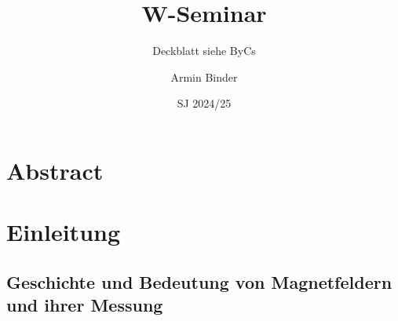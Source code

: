 \documentclass[12pt, a4paper]{article}
\title{W-Seminar}
\subtitle{Deckblatt siehe ByCs}
\author{Armin Binder }
\date{SJ 2024/25}
\begin{document}
\pagestyle{fancy}
\fancyhf{} 
\fancyfoot[C]{\thepage}

\maketitle
\thispagestyle{empty}
\pagebreak

\tableofcontents
\thispagestyle{empty}
\pagebreak

\section{Abstract}


\section{Einleitung}
\subsection{Geschichte und Bedeutung von Magnetfeldern und ihrer Messung}
\end{document}
